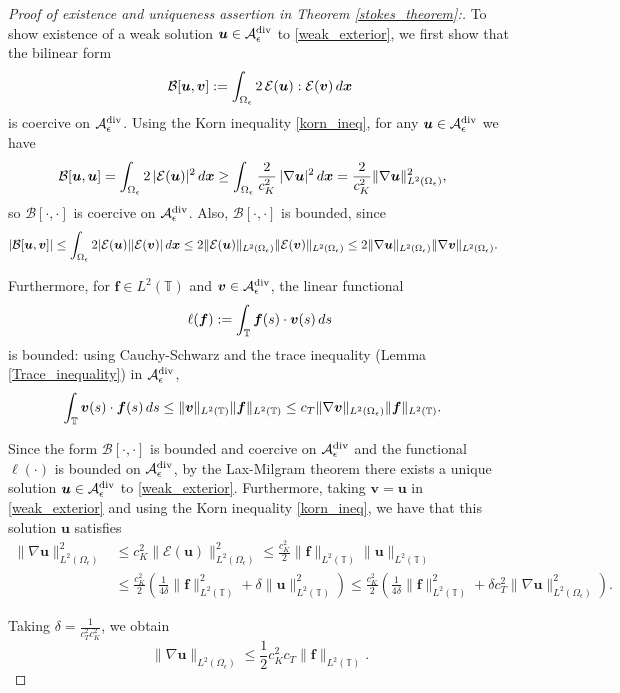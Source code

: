 \documentclass[11pt]{article}
\numberwithin{equation}{section}
\newcommand{\T}{\mathbb{T}}
\newcommand{\A}{\mathcal{A}}
\newcommand{\E}{\mathcal{E}}
\newcommand{\bu}{\bm{u}}
\newcommand{\bx}{\bm{x}}
\newcommand{\bv}{\bm{v}}
\newcommand{\ts}{\thinspace}
\newcommand{\dive}{{\rm{div}}}
\newcommand{\abs}[1]{\left\lvert #1 \right\rvert}
\theoremstyle{definition}
\begin{document}
\begin{proof}[Proof of existence and uniqueness assertion in Theorem \ref{stokes_theorem}:] 
To show existence of a weak solution $\bu \in \A_{\epsilon}^{\dive}$ to \eqref{weak_exterior}, we first show that the bilinear form 
\[ \mathcal{B}[\bu,\bv]:=\int_{\Omega_{\epsilon}} 2 \ts \E(\bu):\E(\bv) \ts d\bx \]
is coercive on $\A_{\epsilon}^{\dive}$. Using the Korn inequality \eqref{korn_ineq}, for any $\bu\in \A_{\epsilon}^{\dive}$ we have
\begin{align*}
\mathcal{B}[\bu,\bu] &= \int_{\Omega_{\epsilon}} 2 \ts |\E(\bu)|^2 \ts d\bx \ge \int_{\Omega_{\epsilon}} \frac{2}{c_K^2} \ts |\nabla\bu|^2 \ts d\bx = \frac{2}{c_K^2}\|\nabla\bu\|_{L^2(\Omega_{\epsilon})}^2 ,
\end{align*}
so $\mathcal{B}[\cdot,\cdot]$ is coercive on $\A_{\epsilon}^{\dive}$. Also, $\mathcal{B}[\cdot,\cdot]$ is bounded, since
\begin{align*}
\abs{\mathcal{B}[\bu,\bv]} &\le \int_{\Omega_{\epsilon}} 2 |\E(\bu)| |\E(\bv)| \ts d\bx \le 2 \|\E(\bu)\|_{L^2(\Omega_{\epsilon})}\|\E(\bv)\|_{L^2(\Omega_{\epsilon})} \le 2 \|\nabla \bu\|_{L^2(\Omega_{\epsilon})}\|\nabla\bv\|_{L^2(\Omega_{\epsilon})}.
\end{align*}

Furthermore, for ${\bm f}\in L^2(\T)$ and $\bv\in \A_{\epsilon}^{\dive}$, the linear functional
\[ \ell({\bm f}) := \int_{\T} {\bm f}(s)\cdot \bv(s) \ts ds \]
is bounded: using Cauchy-Schwarz and the trace inequality (Lemma \ref{Trace_inequality}) in $\A_{\epsilon}^{\dive}$,
\begin{align*}
\int_{\T} \bv(s)\cdot{\bm f}(s) \ts ds &\le \|\bv\|_{L^2(\T)}\|{\bm f}\|_{L^2(\T)} \le c_T\|\nabla\bv\|_{L^2(\Omega_{\epsilon})}\|{\bm f}\|_{L^2(\T)} .
\end{align*}

Since the form $\mathcal{B}[\cdot,\cdot]$ is bounded and coercive on $\A_{\epsilon}^{\dive}$ and the functional $\ell(\cdot)$ is bounded on $\A_{\epsilon}^{\dive}$, by the Lax-Milgram theorem there exists a unique solution $\bu\in \A_{\epsilon}^{\dive}$ to \eqref{weak_exterior}. Furthermore, taking $\bv=\bu$ in \eqref{weak_exterior} and using the Korn inequality \eqref{korn_ineq}, we have that this solution $\bu$ satisfies
\begin{align*}
\|\nabla \bu\|_{L^2(\Omega_{\epsilon})}^2 &\le c_{K}^2\|\E(\bu)\|_{L^2(\Omega_{\epsilon})}^2 \le \frac{c_K^2}{2}\|{\bm f}\|_{L^2(\T)}\|\bu\|_{L^2(\T)} \\
&\le \frac{c_K^2}{2}\left(\frac{1}{4\delta}\|{\bm f}\|_{L^2(\T)}^2+\delta\|\bu\|_{L^2(\T)}^2\right) \le \frac{c_K^2}{2}\left(\frac{1}{4\delta}\|{\bm f}\|_{L^2(\T)}^2+\delta c_T^2\|\nabla\bu\|_{L^2(\Omega_{\epsilon})}^2\right).
\end{align*}

Taking $\delta=\frac{1}{c_T^2c_K^2}$, we obtain
\begin{equation}\label{u_est}
\|\nabla \bu\|_{L^2(\Omega_{\epsilon})} \le \frac{1}{2}c_K^2c_T\|{\bm f}\|_{L^2(\T)}.
\end{equation} 
\end{proof}
\end{document}

